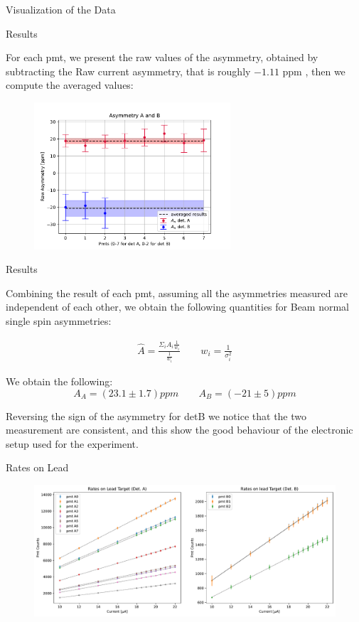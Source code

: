 \documentclass[9pt,a4paper]{beamer}
\begin{document}
\begin{frame}{Visualization of the Data}

\end{frame}

\begin{frame}{Results}

For each pmt, we present the raw values of the asymmetry, obtained by subtracting the Raw current asymmetry, that is roughly $-1.11$ ppm , then we compute the averaged values:

\begin{figure}[hbtp]
\centering
\includegraphics[width = 0.65\textwidth]{figures/FirstResult.pdf}
\end{figure}
\end{frame}

\begin{frame}{Results}
 
Combining the result of each pmt, assuming all the asymmetries measured are independent of each other, we obtain the following quantities for Beam normal single spin asymmetries:

\begin{gather*}
\hat{A} =  \frac{\Sigma_{i} A_{i} \frac{1}{w_{i}}}{\frac{1}{w_{i}}} \qquad w_{i} = \frac{1}{\sigma^{2}_{i}}
\end{gather*}

We obtain the following:
\begin{equation}
A_{A} = (23.1 \pm 1.7) ppm  \qquad A_{B} = (-21  \pm 5)ppm
\end{equation}

Reversing the sign of the asymmetry for detB we notice that the two measurement are consistent, and this show the good behaviour of the electronic setup used for the experiment. 

\end{frame}

\begin{frame}{Rates on Lead}
\begin{figure}[hbtp]
\centering
\includegraphics[width = \textwidth]{figures/LeadRates.pdf}
\end{figure}

\end{frame}
\end{document}
